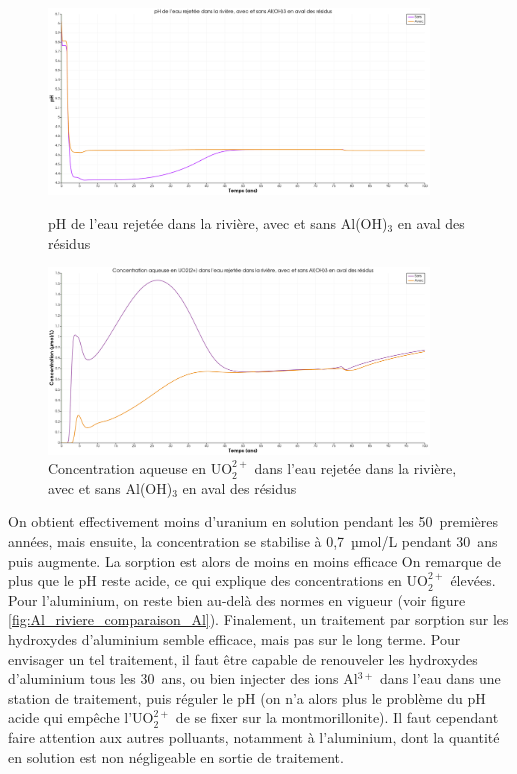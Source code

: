 \documentclass{article}
\begin{document}
\begin{figure}[H]
    \centering
    \begin{minipage}{0.5\textwidth}
        \centering
        \includegraphics[width=0.9\textwidth]{III_B_2_22.png} 
        \caption{pH de l'eau rejetée dans la rivière, avec et sans Al(OH)$_3$ en aval des résidus}
        \label{fig:pH_riviere_comparaison_Al}
    \end{minipage}\hfill
    \begin{minipage}{0.5\textwidth}
        \centering
        \includegraphics[width=0.9\textwidth]{III_B_2_23.png} 
        \caption{Concentration aqueuse en UO$_2^{2+}$ dans l'eau rejetée dans la rivière, avec et sans Al(OH)$_3$ en aval des résidus}
        \label{fig:UO2_riviere_comparaison_Al}
    \end{minipage}
\end{figure}



On obtient effectivement moins d’uranium en solution pendant les 50~premières années, mais ensuite, la concentration se stabilise à 0,7~µmol/L pendant 30~ans puis augmente. La sorption est alors de moins en moins efficace On remarque de plus que le pH reste acide, ce qui explique des concentrations en UO$_2^{2+}$ élevées. Pour l’aluminium, on reste bien au-delà des normes en vigueur (voir figure \ref{fig:Al_riviere_comparaison_Al}).
Finalement, un traitement par sorption sur les hydroxydes d’aluminium semble efficace, mais pas sur le long terme. Pour envisager un tel traitement, il faut être capable de renouveler les hydroxydes d’aluminium tous les 30~ans, ou bien injecter des ions Al$^{3+}$ dans l’eau dans une station de traitement, puis réguler le pH (on n’a alors plus le problème du pH acide qui empêche l’UO$_2^{2+}$ de se fixer sur la montmorillonite). Il faut cependant faire attention aux autres polluants, notamment à l’aluminium, dont la quantité en solution est non négligeable en sortie de traitement.
\end{document}
